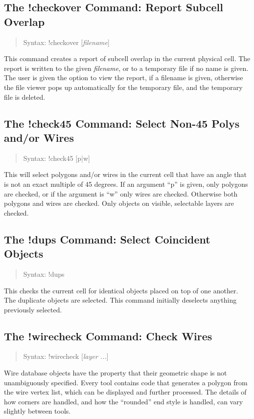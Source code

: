 \subsection{The {\cb !checkover} Command: Report Subcell Overlap}
\begin{quote}
Syntax: {\vt !checkover [{\it filename\/}]}
\end{quote}
This command creates a report of subcell overlap in the current
physical cell.  The report is written to the given {\it filename}, or
to a temporary file if no name is given.  The user is given the option
to view the report, if a filename is given, otherwise the file viewer
pops up automatically for the temporary file, and the temporary file
is deleted.

\subsection{The {\cb !check45} Command: Select Non-45 Polys and/or Wires}
\begin{quote}
Syntax: {\vt !check45} [{\vt p|w}]
\end{quote}
This will select polygons and/or wires in the current cell that have
an angle that is not an exact multiple of 45 degrees.  If an argument
``{\vt p}'' is given, only polygons are checked, or if the argument is
``{\vt w}'' only wires are checked.  Otherwise both polygons and wires
are checked.  Only objects on visible, selectable layers are checked.

\subsection{The {\cb !dups} Command: Select Coincident Objects}
\begin{quote}
Syntax: {\vt !dups}
\end{quote}
This checks the current cell for identical objects placed on top of
one another.  The duplicate objects are selected.  This command
initially deselects anything previously selected.

\subsection{The {\cb !wirecheck} Command: Check Wires}
\label{wirecheck}
\begin{quote}
Syntax: {\vt !wirecheck} [{\it layer ...}]
\end{quote}
Wire database objects have the property that their geometric shape is
not unambiguously specified.  Every tool contains code that generates
a polygon from the wire vertex list, which can be displayed and
further processed.  The details of how corners are handled, and how
the ``rounded'' end style is handled, can vary slightly between tools.

